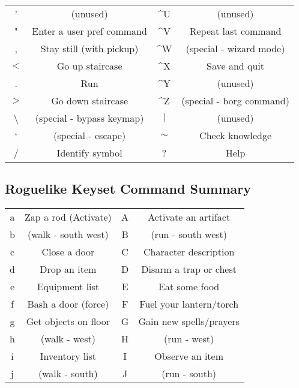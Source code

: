\begin{tabular}{cc|cc}
' & (unused) & \^{}U & (unused)\\
" & Enter a user pref command & \^{}V & Repeat last command\\
, & Stay still (with pickup) & \^{}W & (special - wizard mode)\\
$<$ & Go up staircase & \^{}X & Save and quit\\
. & Run & \^{}Y & (unused)\\
$>$ & Go down staircase & \^{}Z & (special - borg command)\\
\textbackslash & (special - bypass keymap) & $|$ & (unused)\\
` & (special - escape) & $\sim$ & Check knowledge\\
/ & Identify symbol & ? & Help\\
\end{tabular}

\subsection{Roguelike Keyset Command Summary}
\begin{tabular}{cc|cc}
a & Zap a rod (Activate) & A & Activate an artifact\\
b & (walk - south west) & B & (run - south west)\\
c & Close a door & C & Character description\\
d & Drop an item & D & Disarm a trap or chest\\
e & Equipment list & E & Eat some food\\
f & Bash a door (force) & F & Fuel your lantern/torch\\
g & Get objects on floor & G & Gain new spells/prayers\\
h & (walk - west) & H & (run - west)\\
i & Inventory list & I & Observe an item\\
j & (walk - south) & J & (run - south)\\
\end{tabular}

